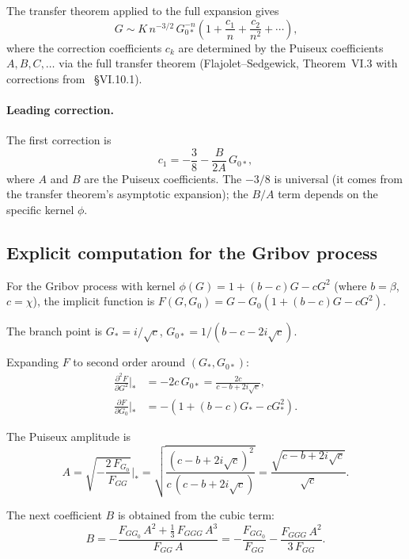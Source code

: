 \documentclass[11pt,a4paper]{article}
\theoremstyle{definition}
\begin{document}
The transfer theorem applied to the full expansion gives
\begin{equation}
[G_0^n]\,G \sim K\,n^{-3/2}\,G_{0*}^{-n}
\left(1 + \frac{c_1}{n} + \frac{c_2}{n^2} + \cdots\right),
\label{eq:transfer_corrected}
\end{equation}
where the correction coefficients $c_k$ are determined by the Puiseux
coefficients $A, B, C, \ldots$ via the full transfer theorem
(Flajolet--Sedgewick, Theorem~VI.3 with corrections from~\cite{flajolet2009}
\S VI.10.1).

\paragraph{Leading correction.}
The first correction is
\begin{equation}
c_1 = -\frac{3}{8} - \frac{B}{2A}\,G_{0*},
\label{eq:c1}
\end{equation}
where $A$ and $B$ are the Puiseux coefficients. The $-3/8$ is universal
(it comes from the transfer theorem's asymptotic expansion); the $B/A$
term depends on the specific kernel $\phi$.

\subsection{Explicit computation for the Gribov process}

For the Gribov process with kernel $\phi(G) = 1 + (b-c)G - cG^2$
(where $b = \beta$, $c = \chi$), the implicit function is
$F(G, G_0) = G - G_0(1 + (b-c)G - cG^2)$.

The branch point is $G_* = i/\sqrt{c}$, $G_{0*} = 1/(b - c - 2i\sqrt{c})$.

Expanding $F$ to second order around $(G_*, G_{0*})$:
\begin{align}
\frac{\partial^2 F}{\partial G^2}\bigg|_{*} &= -2c\,G_{0*} = \frac{2c}{c - b + 2i\sqrt{c}}, \\
\frac{\partial F}{\partial G_0}\bigg|_{*} &= -(1 + (b-c)G_* - cG_*^2).
\end{align}

The Puiseux amplitude is
\begin{equation}
A = \sqrt{-\frac{2\,F_{G_0}}{F_{GG}}}\bigg|_{*}
= \sqrt{\frac{(c - b + 2i\sqrt{c})^2}{c\,(c - b + 2i\sqrt{c})}}
= \frac{\sqrt{c - b + 2i\sqrt{c}}}{\sqrt{c}}.
\end{equation}

The next coefficient $B$ is obtained from the cubic term:
\begin{equation}
B = -\frac{F_{GG_0}\,A^2 + \tfrac{1}{3}\,F_{GGG}\,A^3}{F_{GG}\,A}
= -\frac{F_{GG_0}}{F_{GG}} - \frac{F_{GGG}\,A^2}{3\,F_{GG}}.
\end{equation}
\end{document}
